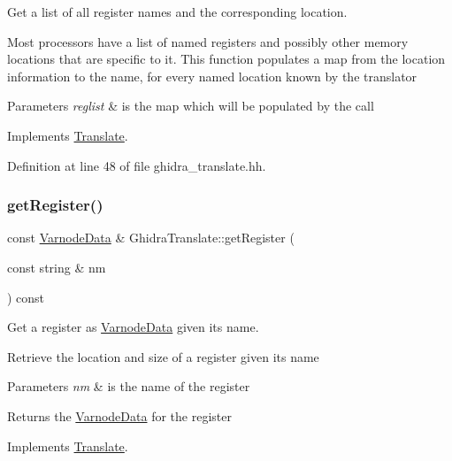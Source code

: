 Get a list of all register names and the corresponding location. 

Most processors have a list of named registers and possibly other memory locations that are specific to it. This function populates a map from the location information to the name, for every named location known by the translator 
\begin{DoxyParams}{Parameters}
{\em reglist} & is the map which will be populated by the call \\
\hline
\end{DoxyParams}


Implements \mbox{\hyperlink{class_translate_a4de12a5d1ad5f080604451e2ed3c163e}{Translate}}.



Definition at line 48 of file ghidra\+\_\+translate.\+hh.

\mbox{\label{class_ghidra_translate_a81e1af3292005903279e80a61a6ccfac}} 
\subsubsection{\texorpdfstring{getRegister()}{getRegister()}}
{\footnotesize\ttfamily const \mbox{\hyperlink{struct_varnode_data}{Varnode\+Data}} \& Ghidra\+Translate\+::get\+Register (\begin{DoxyParamCaption}\item[{const string \&}]{nm }\end{DoxyParamCaption}) const\hspace{0.3cm}{\ttfamily [virtual]}}



Get a register as \mbox{\hyperlink{struct_varnode_data}{Varnode\+Data}} given its name. 

Retrieve the location and size of a register given its name 
\begin{DoxyParams}{Parameters}
{\em nm} & is the name of the register \\
\hline
\end{DoxyParams}
\begin{DoxyReturn}{Returns}
the \mbox{\hyperlink{struct_varnode_data}{Varnode\+Data}} for the register 
\end{DoxyReturn}


Implements \mbox{\hyperlink{class_translate_a3a62c460db4eccc285fa3dd29dd4a29b}{Translate}}.



